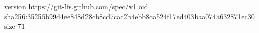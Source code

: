 version https://git-lfs.github.com/spec/v1
oid sha256:35256b99d4ee848d28cb8cd7cac2b4ebb8ca524f17ed403baa074a632871ec30
size 71

